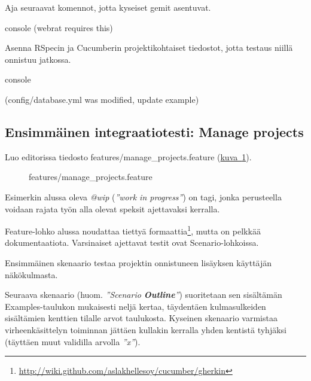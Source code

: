 \documentclass{article}
\newenvironment{myfigure}{
  \begin{figure}
    \centering
    \begin{lrbox}{\myfigurebox}
      \begin{minipage}{0.8\textwidth}
}{
      \end{minipage}
    \end{lrbox}
    \fcolorbox{blue}{blue!1}{\usebox{\myfigurebox}}
  \end{figure}
}
\newcommand{\myref}[2]{\hyperref[#2]{#1~\ref*{#2}}}
\newcommand{\pdfforeignlanguage}[2]{\texorpdfstring{\foreignlanguage{#1}{#2}}{#2}}
\newcommand{\eng}[1]{\pdfforeignlanguage{english}{#1}}
\begin{document}
\begin{samepage}
Aja seuraavat komennot, jotta kyseiset gemit asentuvat.

\begin{pygmented}{console}
(webrat requires this)

\end{pygmented}
\end{samepage}

\begin{samepage}
Asenna RSpecin ja Cucumberin projektikohtaiset tiedostot, jotta testaus niillä
onnistuu jatkossa.

\begin{pygmented}{console}

(config/database.yml was modified, update example)

\end{pygmented}
\end{samepage}

\subsection{Ensimmäinen integraatiotesti: \eng{Manage projects}}

Luo editorissa tiedosto \eng{features/manage\_projects.feature}
(\myref{kuva}{fig:manage-projects-feature}).

\begin{myfigure}
\caption{\eng{features/manage\_projects.feature}}
\label{fig:manage-projects-feature}
\end{myfigure}

Esimerkin alussa oleva \emph{@wip} (\emph{''\eng{work in progress}''}) on tagi,
jonka perusteella voidaan rajata työn alla olevat speksit ajettavaksi kerralla.

\eng{Feature}-lohko alussa noudattaa tiettyä
formaattia\footnote{\url{http://wiki.github.com/aslakhellesoy/cucumber/gherkin}},
mutta on pelkkää dokumentaatiota. Varsinaiset ajettavat testit ovat
\eng{Scenario}-lohkoissa.

Ensimmäinen skenaario testaa projektin onnistuneen lisäyksen käyttäjän
näkökulmasta.

Seuraava skenaario (huom. \emph{''\eng{Scenario \textbf{Outline}}''})
suoritetaan sen sisältämän \eng{Examples}-taulukon mukaisesti neljä kertaa,
täydentäen kulmasulkeiden sisältämien kenttien tilalle arvot taulukosta.
Kyseinen skenaario varmistaa virheenkäsittelyn toiminnan jättäen kullakin
kerralla yhden kentistä tyhjäksi (täyttäen muut validilla arvolla
\emph{''x''}).
\end{document}
